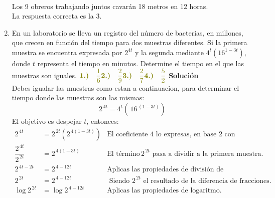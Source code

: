 \documentclass[11pt, a4paper]{article} %
\theoremstyle{dotlessP}
\theoremstyle{dotlessS}
\begin{document}
\begin{enumerate}[label=\color{dg}\theenumi.]
\begin{table}[htbp]
\begin{tabular}{cccc}
 		\end{tabular}
	\end{table}
       \\
	Los 9 obreros trabajando juntos cavarán 18 metros en 12 	horas.    \\
	{\color{dh} La respuesta correcta es la 3.}
	\\
\item {\color{db} En un laboratorio se lleva un registro del número de bacterias, en millones, que crecen en función del tiempo para dos muestras diferentes. Si la primera muestra se encuentra expresada por \(2^{4t}\) y  la segunda mediante \(4^t (16^{1 - 3t})\), donde \(t\) representa el tiempo en minutos. Determine el tiempo en el que las muestras son iguales.}
   \(
\vspace{1\baselineskip} \\ 	
     {\color{dh} \textbf{1.)} \quad \dfrac{1}{6}} \vspace{1\baselineskip} \\ 	
     {\color{dh} \textbf{2.)} \quad \dfrac{2}{9}} \vspace{1\baselineskip} \\ 	
     {\color{dh} \textbf{3.)} \quad \dfrac{2}{7}} \vspace{1\baselineskip} \\ 	
     {\color{dh} \textbf{4.)} \quad \dfrac{5}{2}}   \vspace{1\baselineskip} \\ 	
      \)
      \textbf{Solución} 
    \\ Debes igualar las muestras como estan a continuacion, para determinar el tiempo donde las muestras son las mismas:
\[
2^{\,4t}  = 4^t(\,16^{\,(1 - 3t)})
\]
El objetivo es despejar \(t\), entonces: 
\begin{align*}
2^{\,4t}  &= 2^{\,2t}(2^{\,4(1 - 3t)})   &{\text{El coeficiente 4 lo expresas, en base 2 con exponente 2.}}  
\\
\dfrac{2^{\,4t}}{2^{\,2t}}  &=  2^{\,4(1 - 3t)}  &{\text{El término}\, {2^{\,2t}}  \text{ pasa a dividir a la primera muestra.}} 
\\
2^{\,4t-2t}  &= 2^{\,4 - 12t} &\text{Aplicas las propiedades de división de fracciones.}  
\\
2^{\,2t}  &= 2^{\,4 - 12t} &{\text{ Siendo} \,\, {2^{\,2t}}  \text{ el resultado de la diferencia de fracciones.}} 
\\
\log 2^{\,2t}  &= \log 2^{\,4 - 12t} &\text{Aplicas las propiedades de logaritmo.}  

\end{align*}
\end{enumerate}
\end{document}
